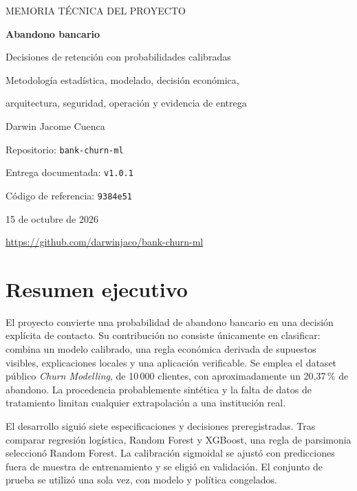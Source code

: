 \documentclass[11pt,a4paper,oneside]{report}
\newcommand{\versioncodigo}{9384e51}
\begin{document}
\begin{titlepage}
\centering
{\large MEMORIA TÉCNICA DEL PROYECTO\par}
\vspace{2cm}
{\Huge\bfseries\color{tinta} Abandono bancario\par}
\vspace{0.4cm}
{\LARGE Decisiones de retención con probabilidades calibradas\par}
\vspace{1cm}
{\large Metodología estadística, modelado, decisión económica,\par
arquitectura, seguridad, operación y evidencia de entrega\par}
\vfill
{\Large Darwin Jacome Cuenca\par}
\vspace{0.5cm}
{\large Repositorio: \texttt{bank-churn-ml}\par}
{\large Entrega documentada: \texttt{v1.0.1}\par}
{\large Código de referencia: \texttt{\versioncodigo}\par}
\vspace{1cm}
{\large 15 de octubre de 2026\par}
\vspace{0.6cm}
\url{https://github.com/darwinjaco/bank-churn-ml}
\end{titlepage}

\chapter*{Resumen ejecutivo}
El proyecto convierte una probabilidad de abandono bancario en una decisión
explícita de contacto. Su contribución no consiste únicamente en clasificar:
combina un modelo calibrado, una regla económica derivada de supuestos visibles,
explicaciones locales y una aplicación verificable. Se emplea el dataset público
\textit{Churn Modelling}, de 10\,000 clientes, con aproximadamente un 20,37\,\%
de abandono. La procedencia probablemente sintética y la falta de datos de
tratamiento limitan cualquier extrapolación a una institución real.

El desarrollo siguió siete especificaciones y decisiones preregistradas. Tras
comparar regresión logística, Random Forest y XGBoost, una regla de parsimonia
seleccionó Random Forest. La calibración sigmoidal se ajustó con predicciones
fuera de muestra de entrenamiento y se eligió en validación. El conjunto de
prueba se utilizó una sola vez, con modelo y política congelados.
\end{document}
